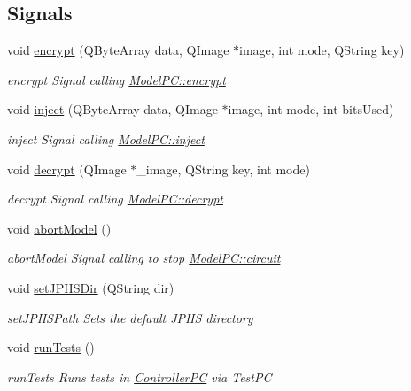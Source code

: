 \subsection*{Signals}
\begin{DoxyCompactItemize}
\item 
void \hyperlink{class_view_p_c_a9d179ff85ed8b1ca0ff7fa495965b52d}{encrypt} (Q\+Byte\+Array data, Q\+Image $\ast$image, int mode, Q\+String key)
\begin{DoxyCompactList}\small\item\em encrypt Signal calling \hyperlink{class_model_p_c_a6f191f62d4635d0d3555fcc0be298794}{Model\+P\+C\+::encrypt} \end{DoxyCompactList}\item 
void \hyperlink{class_view_p_c_a652c98014c2df32178d43a5a9612dd99}{inject} (Q\+Byte\+Array data, Q\+Image $\ast$image, int mode, int bits\+Used)
\begin{DoxyCompactList}\small\item\em inject Signal calling \hyperlink{class_model_p_c_aada6a04d81ada8f2b4ba18108c8d6f10}{Model\+P\+C\+::inject} \end{DoxyCompactList}\item 
void \hyperlink{class_view_p_c_a365df051360d557c7221474ad856e0af}{decrypt} (Q\+Image $\ast$\+\_\+image, Q\+String key, int mode)
\begin{DoxyCompactList}\small\item\em decrypt Signal calling \hyperlink{class_model_p_c_a5995215a34a1e1f504035715a8013809}{Model\+P\+C\+::decrypt} \end{DoxyCompactList}\item 
void \hyperlink{class_view_p_c_aa652102ce6b5757b8eef830409c8cabf}{abort\+Model} ()
\begin{DoxyCompactList}\small\item\em abort\+Model Signal calling to stop \hyperlink{class_model_p_c_a1d0091062a0c836b283ec2f67411623b}{Model\+P\+C\+::circuit} \end{DoxyCompactList}\item 
void \hyperlink{class_view_p_c_ae81085836c0c01bc9556a5b27eb8d19c}{set\+J\+P\+H\+S\+Dir} (Q\+String dir)
\begin{DoxyCompactList}\small\item\em set\+J\+P\+H\+S\+Path Sets the default J\+P\+HS directory \end{DoxyCompactList}\item 
void \hyperlink{class_view_p_c_a96a6c95728bf20c64d2a8fe978495395}{run\+Tests} ()
\begin{DoxyCompactList}\small\item\em run\+Tests Runs tests in \hyperlink{class_controller_p_c}{Controller\+PC} via Test\+PC \end{DoxyCompactList}\end{DoxyCompactItemize}
